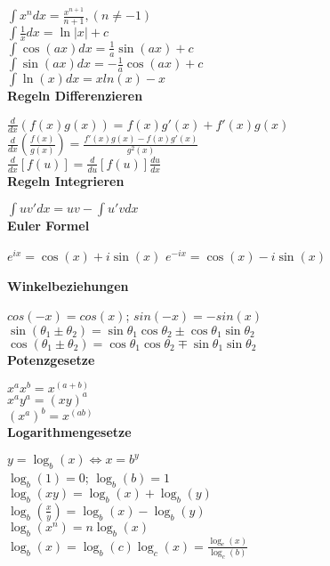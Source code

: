 \documentclass[10pt,twocolumn,a4paper]{article}
\begin{document}
\begin{flushleft}
$\int {x^n } dx = \frac{{x^{n + 1} }}{{n + 1}},(n \ne  - 1)$\\
$\int {\frac{1}{x}} dx = \ln \left| x \right| + c$\\
$\int {\cos (ax)} dx = \frac{1}{a}\sin (ax) + c$\\
$\int {\sin (ax)} dx =  - \frac{1}{a}\cos (ax) + c$\\
$\int {\ln (x)} dx = x ln(x) -x$\\

\textbf{Regeln Differenzieren}

$\frac{d}{{dx}}\left( {f\left( x \right)g\left( x \right)} \right) = f\left( x \right)g'\left( x \right) + f'\left( x \right)g\left( x \right)$\\
$\frac{d}{{dx}}\left( {\frac{{f\left( x \right)}}{{g\left( x \right)}}} \right) = \frac{{f'\left( x \right)g\left( x \right) - f\left( x \right)g'\left( x \right)}}{{g^2 \left( x \right)}}$\\
$\frac{d}{{dx}}\left[ {f\left( u \right)} \right] = \frac{d}{{du}}\left[ {f\left( u \right)} \right]\frac{{du}}{{dx}}$\\

\textbf{Regeln Integrieren}

$\int {uv'} dx = uv - \int {u'v}dx$\\

\textbf{Euler Formel}

$e^{ix} = \cos(x) + i \sin(x)$
$e^{-ix} = \cos(x) - i \sin(x)$

\textbf{Winkelbeziehungen}

$cos(-x) = cos(x)$; $sin(-x) = -sin(x)$\\
$\sin \left( {\theta _1  \pm \theta _2 } \right) = \sin \theta _1 \cos \theta _2  \pm \cos \theta _1 \sin \theta _2$\\
$\cos \left( {\theta _1  \pm \theta _2 } \right) = \cos \theta _1 \cos \theta _2  \mp \sin \theta _1 \sin \theta _2$\\

\textbf{Potenzgesetze}

$x^a x^b  = x^{\left( {a + b} \right)}$\\
$x^a y^a  = \left( {xy} \right)^a$\\
$\left( {x^a } \right)^b  = x^{\left( {ab} \right)}$\\

\textbf{Logarithmengesetze}

$y = \log _b \left( x \right) \Leftrightarrow x = b^y$\\
$\log _b \left( 1 \right) = 0$; $\log _b \left( b \right) = 1$\\
$\log _b \left( {xy} \right) = \log _b \left( x \right) + \log _b \left( y \right)$\\
$\log _b \left( {\frac{x}{y}} \right) = \log _b \left( x \right) - \log _b \left( y \right)$\\
$\log _b \left( {x^n } \right) = n\log _b \left( x \right)$\\
$\log _b \left( x \right) = \log _b \left( c \right)\log _c \left( x \right) = \frac{{\log _c \left( x \right)}}{{\log _c \left( b \right)}}$\\


\end{flushleft}
\end{document}
